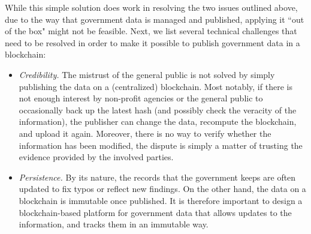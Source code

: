 While this simple solution does work in resolving the two issues outlined above, due to the way that government data is managed and published, applying it ``out of the box" might not be feasible. Next, we list several technical challenges that need to be resolved in order to make it possible to publish government data in a blockchain:
\begin{itemize}
\item {\it Credibility.} The mistrust of the general public is not solved by simply publishing the data on a (centralized) blockchain. Most notably, if there is not enough interest by non-profit agencies or the general public to occasionally back up the latest hash (and possibly check the veracity of the information), the publisher can change the data, recompute the blockchain, and upload it again. Moreover, there is no way to verify whether the information has been modified, the dispute is simply a matter of trusting the evidence provided by the involved parties. %
\item {\it Persistence.} By its nature, the records that the government keeps are often updated to fix typos or reflect new findings. On the other hand, the data on a blockchain is immutable once published. It is therefore important to design a blockchain-based platform for government data that allows updates to the information, and tracks them in an  immutable way.


\end{itemize}
